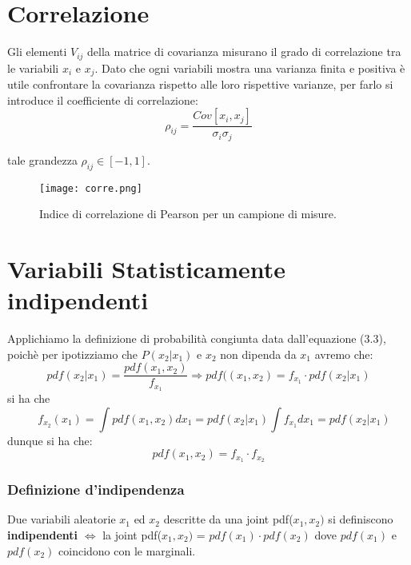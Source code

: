 \section{Correlazione}
Gli elementi $V_{ij}$ della matrice di covarianza misurano il grado di correlazione tra le variabili $x_i$ e $x_j$. Dato che ogni variabili mostra una varianza finita e positiva \`{e} utile confrontare la covarianza  rispetto alle loro rispettive varianze, per farlo si introduce il coefficiente di correlazione:
\begin{equation}
	\rho_{ij} = \dfrac{Cov[x_i,x_j]}{\sigma_i \sigma_j}
\end{equation}

tale grandezza $\rho_{ij} \in [-1,1]$.

\begin{figure}[ht]
\vspace{0.2in}
\texttt{[image: corre.png]}	
\centering
\vspace{0.2in}
\caption{Indice di correlazione di Pearson per un campione di misure.}
\end{figure} 

\section{Variabili Statisticamente indipendenti}
Applichiamo la definizione di probabilit\`{a} congiunta data dall'equazione (3.3), poich\`{e} per ipotizziamo che  $P(x_2 \vert x_1)$ e $x_2$ non dipenda da $x_1$ avremo che:
\begin{equation*}
pdf(x_2 \vert x_1) = \dfrac{pdf(x_1,x_2)}{f_{x_1}} \Rightarrow pdf((x_1,x_2) = f_{x_1} \cdot pdf(x_2 \vert x_1)
\end{equation*}
si ha che  
\begin{equation*}
\quad f_{x_2}(x_1) = \int pdf(x_1,x_2)dx_1 = pdf(x_2\vert x_1) \int f_{x_1}dx_{1} = pdf (x_2 \vert x_1)
\end{equation*}
dunque si ha che:
\begin{equation*}
	pdf(x_1,x_2) = f_{x_1} \cdot f_{x_2}
\end{equation*}

\subsubsection{Definizione d'indipendenza}
Due variabili aleatorie $x_1$ ed $x_2$ descritte da una joint pdf($x_1,x_2)$ si definiscono \textbf{indipendenti} $\iff$ la joint pdf($x_1,x_2)$ = $pdf(x_1) \cdot pdf(x_2)$ dove $ pdf(x_1)$ e $pdf(x_2)$ coincidono con le marginali.

